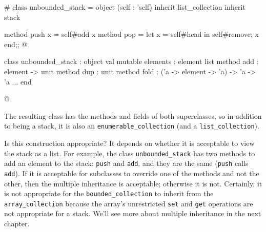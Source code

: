 \begin{ocaml}
# class unbounded_stack =
  object (self : 'self)
     inherit list_collection
     inherit stack

     method push x = self#add x
     method pop =
        let x = self#head in
        self#remove;
        x
  end;;
@
\begin{topoutput}
class unbounded_stack :
  object
    val mutable elements : element list
    method add : element -> unit
    method dup : unit
    method fold : ('a -> element -> 'a) -> 'a -> 'a
    ...
  end
\end{topoutput}
@
\end{ocaml}
%
The resulting class has the methods and fields of both superclasses, so in addition to being a
stack, it is also an \hbox{\lstinline/enumerable_collection/} (and a \hbox{\lstinline/list_collection/}).

Is this construction appropriate?  It depends on whether it is acceptable to view the stack as a
list.  For example, the class \hbox{\lstinline/unbounded_stack/} has two methods to add an element to the
stack: \hbox{\lstinline/push/} and \hbox{\lstinline/add/}, and they are the same (\hbox{\lstinline/push/}
calls \hbox{\lstinline/add/}).  If it is acceptable for subclasses to override one of the methods and not
the other, then the multiple inheritance is acceptable; otherwise it is not.  Certainly, it is not
appropriate for the \hbox{\lstinline/bounded_collection/} to inherit from the \hbox{\lstinline/array_collection/}
because the array's unrestricted \hbox{\lstinline/set/} and \hbox{\lstinline/get/} operations are not appropriate
for a stack.  We'll see more about multiple inheritance in the next chapter.

